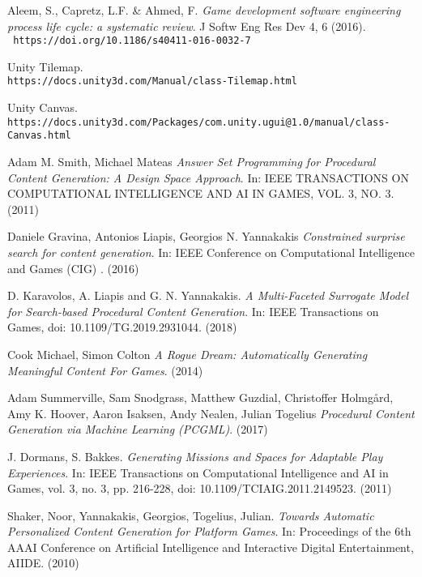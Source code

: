 \begin{thebibliography}{9}
 Aleem, S., Capretz, L.F. \& Ahmed, F. \textit{Game development software engineering process life cycle: a systematic review}. J Softw Eng Res Dev 4, 6 (2016).\\
\texttt{ https://doi.org/10.1186/s40411-016-0032-7}

 Unity Tilemap.\\
\texttt{https://docs.unity3d.com/Manual/class-Tilemap.html}

 Unity Canvas.\\
\texttt{https://docs.unity3d.com/Packages/com.unity.ugui@1.0/manual/class-Canvas.html}

 Adam M. Smith, Michael Mateas \textit{Answer Set Programming for Procedural Content
Generation: A Design Space Approach}. In: IEEE TRANSACTIONS ON COMPUTATIONAL INTELLIGENCE AND AI IN GAMES, VOL. 3, NO. 3. (2011)

  Daniele Gravina, Antonios Liapis, Georgios N. Yannakakis  \textit{ Constrained surprise search for content generation}. In: IEEE Conference on Computational Intelligence and Games (CIG) . (2016)

  D. Karavolos, A. Liapis and G. N. Yannakakis. \textit{A Multi-Faceted Surrogate Model for Search-based Procedural Content Generation}. In: IEEE Transactions on Games, doi: 10.1109/TG.2019.2931044. (2018)

  Cook Michael,  Simon Colton \textit{A Rogue Dream: Automatically Generating Meaningful Content For Games}. (2014)

 Adam Summerville, Sam Snodgrass, Matthew Guzdial, Christoffer Holmgård, Amy K. Hoover, Aaron Isaksen, Andy Nealen, Julian Togelius \textit{Procedural Content Generation via Machine Learning (PCGML)}. (2017)

 J. Dormans, S. Bakkes. \textit{Generating Missions and Spaces for Adaptable Play Experiences}. In: IEEE Transactions on Computational Intelligence and AI in Games, vol. 3, no. 3, pp. 216-228, doi: 10.1109/TCIAIG.2011.2149523. (2011)

 Shaker, Noor, Yannakakis, Georgios, Togelius, Julian. \textit{Towards Automatic Personalized Content Generation for Platform Games}. In: Proceedings of the 6th AAAI Conference on Artificial Intelligence and Interactive Digital Entertainment, AIIDE. (2010)

\end{thebibliography}